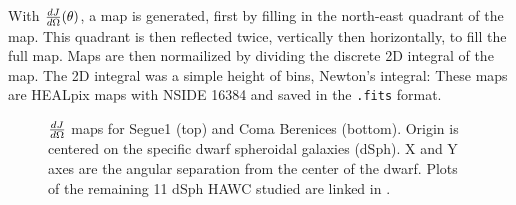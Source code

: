 With $\frac{dJ}{d\Omega}(\theta)$, a map is generated, first by filling in the north-east quadrant of the map.
This quadrant is then reflected twice, vertically then horizontally, to fill the full map.
Maps are then normailized by dividing the discrete 2D integral of the map.
The 2D integral was a simple height of bins, Newton's integral:
\newtonIntegral
These maps are HEALpix maps with NSIDE 16384 and saved in the \texttt{.fits} format.

\begin{figure}
    \caption{$\frac{dJ}{d\Omega}$ maps for Segue1 (top) and Coma Berenices (bottom). Origin is centered on the specific dwarf spheroidal galaxies (dSph). X and Y axes are the angular separation from the center of the dwarf. Plots of the remaining 11 dSph HAWC studied are linked in .}\label{fig:gd_spatialmodel}
\end{figure}

